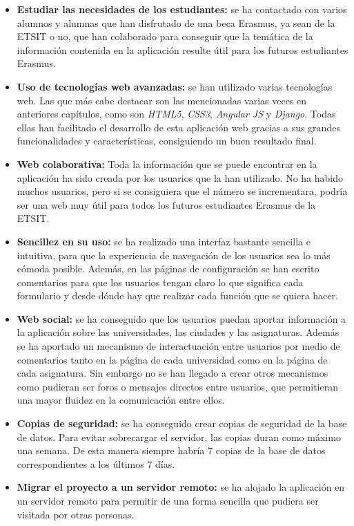 \documentclass[a4paper, 12pt]{book}
\begin{document}
\begin{itemize}
        \item \textbf{Estudiar las necesidades de los estudiantes:} se ha contactado con varios alumnos y alumnas que han disfrutado de una beca Erasmus, ya sean de la ETSIT o no, que han colaborado para conseguir que la temática de la información contenida en la aplicación resulte útil para los futuros estudiantes Erasmus.
        \item \textbf{Uso de tecnologías web avanzadas:} se han utilizado varias tecnologías web. Las que más cabe destacar son las mencionadas varias veces en anteriores capítulos, como son \textit{HTML5}, \textit{CSS3}, \textit{Angular JS} y \textit{Django}. Todas ellas han facilitado el desarrollo de esta aplicación web gracias a sus grandes funcionalidades y características, consiguiendo un buen resultado final.
        \item \textbf{Web colaborativa:} Toda la información que se puede encontrar en la aplicación ha sido creada por los usuarios que la han utilizado. No ha habido muchos usuarios, pero si se consiguiera que el número se incrementara, podría ser una web muy útil para todos los futuros estudiantes Erasmus de la ETSIT.
        \item \textbf{Sencillez en su uso:} se ha realizado una interfaz bastante sencilla e intuitiva, para que la experiencia de navegación de los usuarios sea lo más cómoda posible. Además, en las páginas de configuración se han escrito comentarios para que los usuarios tengan claro lo que significa cada formulario y desde dónde hay que realizar cada función que se quiera hacer.
        \item \textbf{Web social:} se ha conseguido que los usuarios puedan aportar información a la aplicación sobre las universidades, las ciudades y las asignaturas. Además se ha aportado un mecanismo de interactuación entre usuarios por medio de comentarios tanto en la página de cada universidad como en la página de cada asignatura. Sin embargo no se han llegado a crear otros mecanismos como pudieran ser foros o mensajes directos entre usuarios, que permitieran una mayor fluidez en la comunicación entre ellos.
        \item \textbf{Copias de seguridad:} se ha conseguido crear copias de seguridad de la base de datos. Para evitar sobrecargar el servidor, las copias duran como máximo una semana. De esta manera siempre habría 7 copias de la base de datos correspondientes a los últimos 7 días.
        \item \textbf{Migrar el proyecto a un servidor remoto:} se ha alojado la aplicación en un servidor remoto para permitir de una forma sencilla que pudiera ser visitada por otras personas.
\end{itemize}
\end{document}
